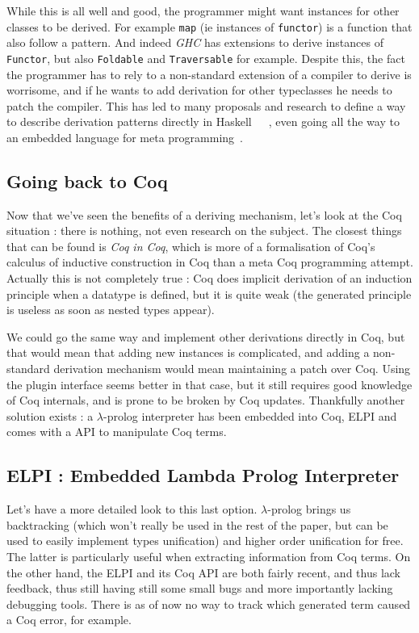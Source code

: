 \documentclass{article}
\begin{document}
While this is all well and good, the programmer might want instances for other
classes to be derived. For example \texttt{map} (ie instances of \texttt{functor})
is a function that also follow a pattern. And indeed \emph{GHC} has extensions
to derive instances of \texttt{Functor}, but also \texttt{Foldable} and
\texttt{Traversable} for example. Despite this, the fact the programmer has to
rely to a non-standard extension of a compiler to derive is worrisome, and if he
wants to add derivation for other typeclasses he needs to patch the compiler.
This has led to many proposals and research to define a way to describe derivation
patterns directly in Haskell~\cite{genDerHaskell10}~\cite{reflDer97}~\cite{genDep},
even going all the way to an embedded language for meta programming~\cite{templateHaskell}.

\subsection{Going back to Coq}

Now that we've seen the benefits of a deriving mechanism, let's look at the Coq
situation : there is nothing, not even research on the subject. The closest
things that can be found is \emph{Coq in Coq}\cite{coqincoq}, which is more of
a formalisation of Coq's calculus of inductive construction in Coq than a
meta Coq programming attempt. Actually this is not completely true : Coq does
implicit derivation of an induction principle when a datatype is defined, but
it is quite weak (the generated principle is useless as soon as nested types
appear).

We could go the same way and implement other derivations directly in Coq, but
that would mean that adding new instances is complicated, and adding a
non-standard derivation mechanism would mean maintaining a patch over Coq. Using
the plugin interface seems better in that case, but it still requires good
knowledge of Coq internals, and is prone to be broken by Coq updates. Thankfully
another solution exists : a $\lambda$-prolog\cite{HiOrProg} interpreter has
been embedded into Coq, ELPI\cite{ELPI} and comes with a API to manipulate
Coq terms.

\subsection{ELPI : Embedded Lambda Prolog Interpreter}

Let's have a more detailed look to this last option. $\lambda$-prolog brings us
backtracking (which won't really be used in the rest of the paper, but can be
used to easily implement types unification\cite{ELPItype}) and higher order unification
for free. The latter is particularly useful when extracting information from
Coq terms. On the other hand, the ELPI and its Coq API are both fairly recent,
and thus lack feedback, thus still having still some small bugs and more
importantly lacking debugging tools. There is as of now no way to track which generated
term caused a Coq error, for example.
\end{document}
